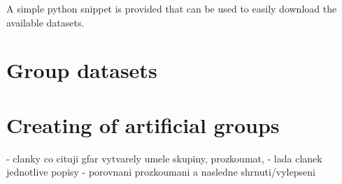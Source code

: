 A simple python snippet is provided that can be used to easily download the available datasets.


    
\section{Group datasets}

\section{Creating of artificial groups}

- clanky co cituji gfar vytvarely umele skupiny, prozkoumat,
- lada clanek jednotlive popisy
- porovnani prozkoumani a nasledne shrnuti/vylepseni
